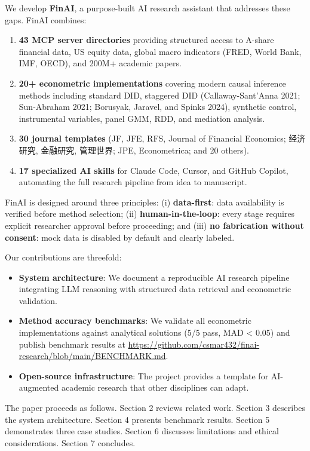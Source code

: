\documentclass[12pt, a4paper]{article}
\begin{document}
We develop \textbf{FinAI}, a purpose-built AI research assistant that addresses these gaps. FinAI combines:

\begin{enumerate}
    \item \textbf{43 MCP server directories} providing structured access to A-share financial data, US equity data, global macro indicators (FRED, World Bank, IMF, OECD), and 200M+ academic papers.
    \item \textbf{20+ econometric implementations} covering modern causal inference methods including standard DID, staggered DID (Callaway-Sant'Anna 2021; Sun-Abraham 2021; Borusyak, Jaravel, and Spinks 2024), synthetic control, instrumental variables, panel GMM, RDD, and mediation analysis.
    \item \textbf{30 journal templates} (JF, JFE, RFS, Journal of Financial Economics; 经济研究, 金融研究, 管理世界; JPE, Econometrica; and 20 others).
    \item \textbf{17 specialized AI skills} for Claude Code, Cursor, and GitHub Copilot, automating the full research pipeline from idea to manuscript.
\end{enumerate}

FinAI is designed around three principles: (i) \textbf{data-first}: data availability is verified before method selection; (ii) \textbf{human-in-the-loop}: every stage requires explicit researcher approval before proceeding; and (iii) \textbf{no fabrication without consent}: mock data is disabled by default and clearly labeled.

Our contributions are threefold:

\begin{itemize}
    \item \textbf{System architecture}: We document a reproducible AI research pipeline integrating LLM reasoning with structured data retrieval and econometric validation.
    \item \textbf{Method accuracy benchmarks}: We validate all econometric implementations against analytical solutions (5/5 pass, MAD < 0.05) and publish benchmark results at \url{https://github.com/csmar432/finai-research/blob/main/BENCHMARK.md}.
    \item \textbf{Open-source infrastructure}: The project provides a template for AI-augmented academic research that other disciplines can adapt.
\end{itemize}

The paper proceeds as follows. Section 2 reviews related work. Section 3 describes the system architecture. Section 4 presents benchmark results. Section 5 demonstrates three case studies. Section 6 discusses limitations and ethical considerations. Section 7 concludes.
\end{document}
